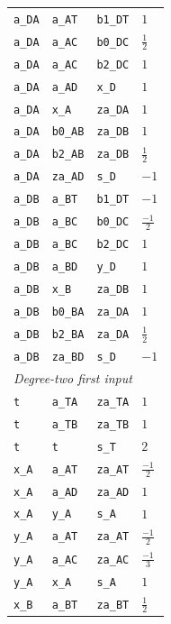 \begin{longtable}{llll}
\texttt{a\_DA} & \texttt{a\_AT} & \texttt{b1\_DT} & $1$\\
\texttt{a\_DA} & \texttt{a\_AC} & \texttt{b0\_DC} & $\frac{1}{2}$\\
\texttt{a\_DA} & \texttt{a\_AC} & \texttt{b2\_DC} & $1$\\
\texttt{a\_DA} & \texttt{a\_AD} & \texttt{x\_D} & $1$\\
\texttt{a\_DA} & \texttt{x\_A} & \texttt{za\_DA} & $1$\\
\texttt{a\_DA} & \texttt{b0\_AB} & \texttt{za\_DB} & $1$\\
\texttt{a\_DA} & \texttt{b2\_AB} & \texttt{za\_DB} & $\frac{1}{2}$\\
\texttt{a\_DA} & \texttt{za\_AD} & \texttt{s\_D} & $-1$\\
\texttt{a\_DB} & \texttt{a\_BT} & \texttt{b1\_DT} & $-1$\\
\texttt{a\_DB} & \texttt{a\_BC} & \texttt{b0\_DC} & $\frac{-1}{2}$\\
\texttt{a\_DB} & \texttt{a\_BC} & \texttt{b2\_DC} & $1$\\
\texttt{a\_DB} & \texttt{a\_BD} & \texttt{y\_D} & $1$\\
\texttt{a\_DB} & \texttt{x\_B} & \texttt{za\_DB} & $1$\\
\texttt{a\_DB} & \texttt{b0\_BA} & \texttt{za\_DA} & $1$\\
\texttt{a\_DB} & \texttt{b2\_BA} & \texttt{za\_DA} & $\frac{1}{2}$\\
\texttt{a\_DB} & \texttt{za\_BD} & \texttt{s\_D} & $-1$\\
\multicolumn{4}{l}{\textit{Degree-two first input}}\\\hline
\texttt{t} & \texttt{a\_TA} & \texttt{za\_TA} & $1$\\
\texttt{t} & \texttt{a\_TB} & \texttt{za\_TB} & $1$\\
\texttt{t} & \texttt{t} & \texttt{s\_T} & $2$\\
\texttt{x\_A} & \texttt{a\_AT} & \texttt{za\_AT} & $\frac{-1}{2}$\\
\texttt{x\_A} & \texttt{a\_AD} & \texttt{za\_AD} & $1$\\
\texttt{x\_A} & \texttt{y\_A} & \texttt{s\_A} & $1$\\
\texttt{y\_A} & \texttt{a\_AT} & \texttt{za\_AT} & $\frac{-1}{2}$\\
\texttt{y\_A} & \texttt{a\_AC} & \texttt{za\_AC} & $\frac{-1}{3}$\\
\texttt{y\_A} & \texttt{x\_A} & \texttt{s\_A} & $1$\\
\texttt{x\_B} & \texttt{a\_BT} & \texttt{za\_BT} & $\frac{1}{2}$\\

\end{longtable}
